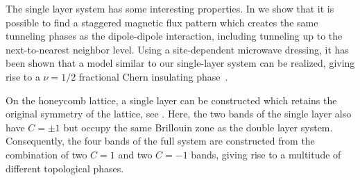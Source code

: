 The single layer system has some interesting properties.
In  we show that it is possible to find a staggered magnetic flux pattern which creates the same tunneling phases as the dipole-dipole interaction, including tunneling up to the next-to-nearest neighbor level.
Using a site-dependent microwave dressing, it has been shown that a model similar to our single-layer system can be realized, giving rise to a $\nu=1/2$ fractional Chern insulating phase~\cite{Yao2012,Yao2013}.

On the honeycomb lattice, a single layer can be constructed which retains the original symmetry of the lattice, see . Here, the two bands of the single layer also have $C=\pm 1$ but occupy the same Brillouin zone as the double layer system. Consequently, the four bands of the full system are constructed from the combination of two $C=1$ and two $C=-1$ bands, giving rise to a multitude of different topological phases.

